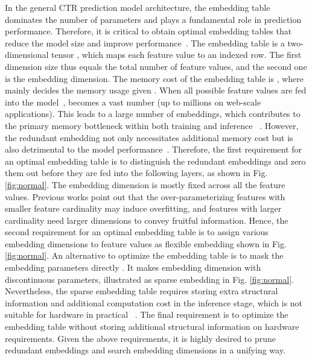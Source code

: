 \documentclass[sigconf]{acmart}
\begin{document}
In the general CTR prediction model architecture, the embedding table dominates the number of parameters and plays a fundamental role in prediction performance. Therefore, it is critical to obtain optimal embedding tables that reduce the model size and improve performance~\cite{MGQE,QR}. The embedding table is a two-dimensional tensor , which maps each feature value to an indexed row. The first dimension size  thus equals the total number of feature values, and the second one  is the embedding dimension. The memory cost of the embedding table is , where  mainly decides the memory usage given . When all possible feature values are fed into the model~\cite{DeepFM,NFM},  becomes a vast number (up to millions on web-scale applications). This leads to a large number of embeddings, which contributes to the primary memory bottleneck within both training and inference ~\cite{sfctr}. However, the redundant embedding not only necessitates additional memory cost but is also detrimental to the model performance~\cite{autofield}. Therefore, the first requirement for an optimal embedding table is to distinguish the redundant embeddings and zero them out before they are fed into the following layers, as shown in Fig. \ref{fig:normal}.
The embedding dimension  is mostly fixed across all the feature values. Previous works\cite{MGQE,AutoDim} point out that the over-parameterizing features with smaller feature cardinality may induce overfitting, and features with larger cardinality need larger dimensions to convey fruitful information. Hence, the second requirement for an optimal embedding table is to assign various embedding dimensions to feature values as flexible embedding shown in Fig. \ref{fig:normal}.
An alternative to optimize the embedding table is to mask the embedding parameters directly \cite{single-shot, PEP}. It makes embedding dimension  with discontinuous parameters, illustrated as sparse embedding in Fig. \ref{fig:normal}. Nevertheless, the sparse embedding table requires storing extra structural information and additional computation cost in the inference stage, which is not suitable for hardware in practical ~\cite{deeplight}.
The final requirement is to optimize the embedding table without storing additional structural information on hardware requirements. 
Given the above requirements, it is highly desired to prune redundant embeddings and search embedding dimensions in a unifying way.
\end{document}
